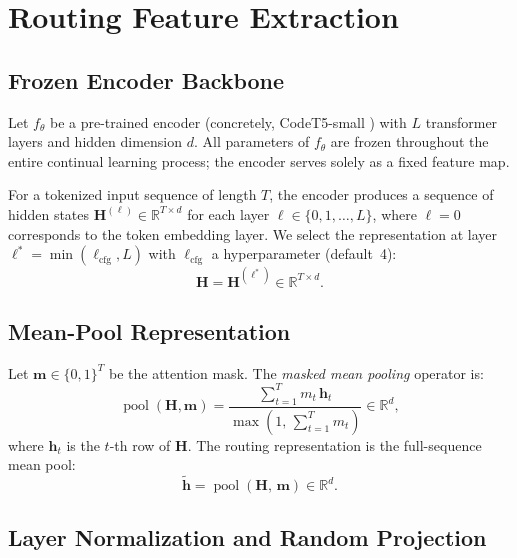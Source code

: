 \documentclass[12pt,a4paper]{article}
\begin{document}
\section{Routing Feature Extraction}
\label{sec:features}

\subsection{Frozen Encoder Backbone}

Let $f_\theta$ be a pre-trained encoder (concretely, CodeT5-small \cite{wang2021codet5}) with $L$ transformer layers and hidden dimension $d$.
All parameters of $f_\theta$ are frozen throughout the entire continual learning process; the encoder serves solely as a fixed feature map.

For a tokenized input sequence of length $T$, the encoder produces a sequence of hidden states $\mathbf{H}^{(\ell)} \in \mathbb{R}^{T \times d}$ for each layer $\ell \in \{0, 1, \ldots, L\}$, where $\ell = 0$ corresponds to the token embedding layer.
We select the representation at layer $\ell^* = \min(\ell_{\mathrm{cfg}}, L)$ with $\ell_{\mathrm{cfg}}$ a hyperparameter (default~4):
\begin{equation}
    \mathbf{H} = \mathbf{H}^{(\ell^*)} \in \mathbb{R}^{T \times d}.
\end{equation}

\subsection{Mean-Pool Representation}

Let $\mathbf{m} \in \{0,1\}^T$ be the attention mask.
The \emph{masked mean pooling} operator is:
\begin{equation}
    \operatorname{pool}(\mathbf{H}, \mathbf{m}) = \frac{\sum_{t=1}^{T} m_t \, \mathbf{h}_t}{\max\!\left(1,\, \sum_{t=1}^{T} m_t\right)} \in \mathbb{R}^d,
\end{equation}
where $\mathbf{h}_t$ is the $t$-th row of $\mathbf{H}$.
The routing representation is the full-sequence mean pool:
\begin{equation}
    \tilde{\mathbf{h}} = \operatorname{pool}(\mathbf{H},\, \mathbf{m}) \in \mathbb{R}^d.
    \label{eq:hfull}
\end{equation}

\subsection{Layer Normalization and Random Projection}
\label{sec:proj}
\end{document}
